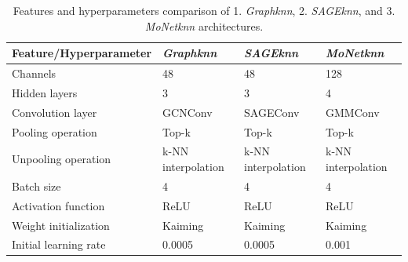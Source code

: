\begin{table}[ht]
    \centering
    \caption{Features and hyperparameters comparison of 1. \textit{Graphknn}, 2. \textit{SAGEknn}, and 3. \textit{MoNetknn} architectures.}
    \label{prophp}
    \begin{tabular}{|l|l|l|l|}
    \hline
    \textbf{Feature/Hyperparameter}    & \textit{Graphknn} & \textit{SAGEknn}   & \textit{MoNetknn} \\
    \hline
    Channels    & 48 & 48 & 128                           \\
    \hline
    Hidden layers    & 3 & 3 & 4                          \\
    \hline
    Convolution layer             &     GCNConv & SAGEConv & GMMConv                   \\
    \hline
    Pooling operation             &    Top-k &  Top-k &  Top-k                     \\
    \hline
    Unpooling operation         &   k-NN interpolation&   k-NN interpolation&   k-NN interpolation                     \\
    \hline
    Batch size                 & 4 & 4& 4                         \\
    \hline
    Activation function        & ReLU  & ReLU  & ReLU                       \\
    \hline
    Weight initialization    &  Kaiming &  Kaiming &  Kaiming                        \\
    \hline
    Initial learning rate       & 0.0005 & 0.0005 & 0.001                        \\
    \hline
    \end{tabular}
    \end{table}
